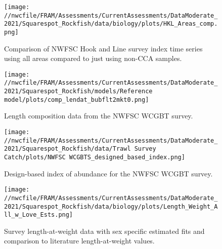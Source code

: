\documentclass[11pt,
  english,
  a4paper,
]{article}
\begin{document}
\begin{figure}
\centering
\texttt{[image: //nwcfile/FRAM/Assessments/CurrentAssessments/DataModerate\_2021/Squarespot\_Rockfish/data/biology/plots/HKL\_Areas\_comp.png]}
\caption{Comparison of NWFSC Hook and Line survey index time series using all areas compared to just using non-CCA samples.\label{fig:hkl-index-comparison}}
\end{figure}

\tagmcend\tagstructend


\begin{figure}
\centering
\texttt{[image: //nwcfile/FRAM/Assessments/CurrentAssessments/DataModerate\_2021/Squarespot\_Rockfish/models/Reference model/plots/comp\_lendat\_bubflt2mkt0.png]}
\caption{Length composition data from the NWFSC WCGBT survey.\label{fig:wcgbts-len-data}}
\end{figure}

\tagmcend\tagstructend


\begin{figure}
\centering
\texttt{[image: //nwcfile/FRAM/Assessments/CurrentAssessments/DataModerate\_2021/Squarespot\_Rockfish/data/Trawl Survey Catch/plots/NWFSC WCGBTS\_designed\_based\_index.png]}
\caption{Design-based index of abundance for the NWFSC WCGBT survey.\label{fig:wcgbts-dbindex}}
\end{figure}

\tagmcend\tagstructend


\begin{figure}
\centering
\texttt{[image: //nwcfile/FRAM/Assessments/CurrentAssessments/DataModerate\_2021/Squarespot\_Rockfish/data/biology/plots/Length\_Weight\_All\_w\_Love\_Ests.png]}
\caption{Survey length-at-weight data with sex specific estimated fits and comparison to literature length-at-weight values.\label{fig:len-weight}}
\end{figure}
\end{document}
